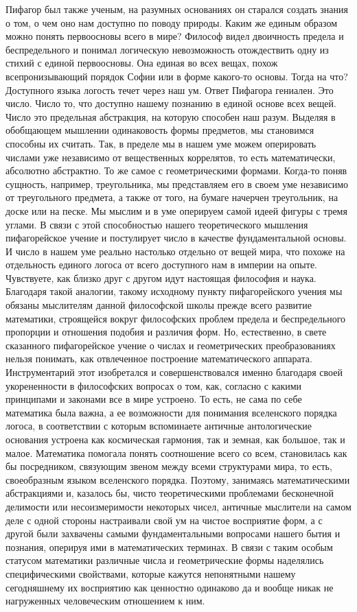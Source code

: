 Пифагор был также ученым, на разумных основаниях он старался
создать знания о том, о чем оно нам доступно по поводу природы. Каким же единым
образом можно понять первоосновы всего в мире? Философ видел
двоичность предела и беспредельного и понимал логическую невозможность
отождествить одну из стихий с единой первоосновы. Она единая во всех вещах,
похож всепронизывающий порядок Софии или в форме какого-то основы. Тогда на что?
Доступного языка логость течет через наш ум. Ответ Пифагора гениален. Это число.
Число то, что доступно нашему познанию в единой основе всех вещей. Число это предельная абстракция, на которую способен наш разум. Выделяя в обобщающем мышлении одинаковость формы предметов, мы
становимся способны их считать. Так, в пределе мы в нашем уме можем оперировать
числами уже независимо от вещественных коррелятов, то есть математически,
абсолютно абстрактно. То же самое с геометрическими формами. Когда-то поняв
сущность, например, треугольника, мы представляем его в своем уме независимо от
треугольного предмета, а также от того, на бумаге начерчен треугольник, на доске
или на песке. Мы мыслим и в уме оперируем самой идеей фигуры с тремя углами. В
связи с этой способностью нашего теоретического мышления пифагорейское учение и
постулирует число в качестве фундаментальной основы. И число в нашем уме реально
настолько отдельно от вещей мира, что похоже на отдельность единого логоса от
всего доступного нам в империи на опыте. Чувствуете, как близко друг с другом
идут настоящая философия и наука. Благодаря такой аналогии, такому исходному
пункту пифагорейского учения мы обязаны мыслителям данной философской школы
прежде всего развитие математики, строящейся вокруг философских проблем предела
и беспредельного пропорции и отношения подобия и различия форм. Но, естественно,
в свете сказанного пифагорейское учение о числах и геометрических
преобразованиях нельзя понимать, как отвлеченное построение математического
аппарата. Инструментарий этот изобретался и совершенствовался именно благодаря
своей укорененности в философских вопросах о том, как, согласно с какими
принципами и законами все в мире устроено. То есть, не сама по себе математика
была важна, а ее возможности для понимания вселенского порядка логоса, в
соответствии с которым вспоминаете античные антологические основания устроена
как космическая гармония, так и земная, как большое, так и малое. Математика
помогала понять соотношение всего со всем, становилась как бы посредником,
связующим звеном между всеми структурами мира, то есть, своеобразным языком
вселенского порядка. Поэтому, занимаясь математическими абстракциями и, казалось
бы, чисто теоретическими проблемами бесконечной делимости или несоизмеримости
некоторых чисел, античные мыслители на самом деле с одной стороны настраивали
свой ум на чистое восприятие форм, а с другой были захвачены самыми
фундаментальными вопросами нашего бытия и познания, оперируя ими в
математических терминах. В связи с таким особым статусом математики различные
числа и геометрические формы наделялись специфическими свойствами, которые
кажутся непонятными нашему сегодняшнему их восприятию как ценностно одинаково да
и вообще никак не нагруженных человеческим отношением к ним. 

